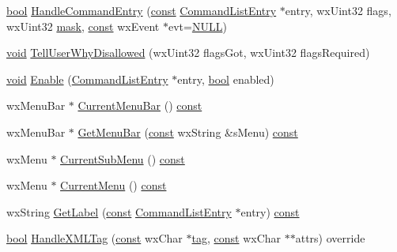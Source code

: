 \begin{DoxyCompactItemize}
\hyperlink{mac_2config_2i386_2lib-src_2libsoxr_2soxr-config_8h_abb452686968e48b67397da5f97445f5b}{bool} \hyperlink{class_command_manager_a2047a83e3554cd09743643968736d1a9}{Handle\+Command\+Entry} (\hyperlink{getopt1_8c_a2c212835823e3c54a8ab6d95c652660e}{const} \hyperlink{struct_command_list_entry}{Command\+List\+Entry} $\ast$entry, wx\+Uint32 flags, wx\+Uint32 \hyperlink{structmask}{mask}, \hyperlink{getopt1_8c_a2c212835823e3c54a8ab6d95c652660e}{const} wx\+Event $\ast$evt=\hyperlink{px__mixer_8h_a070d2ce7b6bb7e5c05602aa8c308d0c4}{N\+U\+LL})
\item 
\hyperlink{sound_8c_ae35f5844602719cf66324f4de2a658b3}{void} \hyperlink{class_command_manager_afe3ecb151af1777dbc3e307265c9d8e1}{Tell\+User\+Why\+Disallowed} (wx\+Uint32 flags\+Got, wx\+Uint32 flags\+Required)
\item 
\hyperlink{sound_8c_ae35f5844602719cf66324f4de2a658b3}{void} \hyperlink{class_command_manager_a86d9c8b5613a5da4c6967d03e3a1bfaa}{Enable} (\hyperlink{struct_command_list_entry}{Command\+List\+Entry} $\ast$entry, \hyperlink{mac_2config_2i386_2lib-src_2libsoxr_2soxr-config_8h_abb452686968e48b67397da5f97445f5b}{bool} enabled)
\item 
wx\+Menu\+Bar $\ast$ \hyperlink{class_command_manager_a9211babaf4c88541a0a4d57c38724582}{Current\+Menu\+Bar} () \hyperlink{getopt1_8c_a2c212835823e3c54a8ab6d95c652660e}{const} 
\item 
wx\+Menu\+Bar $\ast$ \hyperlink{class_command_manager_a4461bc53140bf9640a07ad748474bf19}{Get\+Menu\+Bar} (\hyperlink{getopt1_8c_a2c212835823e3c54a8ab6d95c652660e}{const} wx\+String \&s\+Menu) \hyperlink{getopt1_8c_a2c212835823e3c54a8ab6d95c652660e}{const} 
\item 
wx\+Menu $\ast$ \hyperlink{class_command_manager_aee258f130ed87516ffb340da425f0d16}{Current\+Sub\+Menu} () \hyperlink{getopt1_8c_a2c212835823e3c54a8ab6d95c652660e}{const} 
\item 
wx\+Menu $\ast$ \hyperlink{class_command_manager_a15d5b893166eb25cbe573c7a7edce62e}{Current\+Menu} () \hyperlink{getopt1_8c_a2c212835823e3c54a8ab6d95c652660e}{const} 
\item 
wx\+String \hyperlink{class_command_manager_a878e79d0e1748f855a3bffdaa67cbe76}{Get\+Label} (\hyperlink{getopt1_8c_a2c212835823e3c54a8ab6d95c652660e}{const} \hyperlink{struct_command_list_entry}{Command\+List\+Entry} $\ast$entry) \hyperlink{getopt1_8c_a2c212835823e3c54a8ab6d95c652660e}{const} 
\item 
\hyperlink{mac_2config_2i386_2lib-src_2libsoxr_2soxr-config_8h_abb452686968e48b67397da5f97445f5b}{bool} \hyperlink{class_command_manager_ac9423729c1eedcefdc2c5088485c2441}{Handle\+X\+M\+L\+Tag} (\hyperlink{getopt1_8c_a2c212835823e3c54a8ab6d95c652660e}{const} wx\+Char $\ast$\hyperlink{structtag}{tag}, \hyperlink{getopt1_8c_a2c212835823e3c54a8ab6d95c652660e}{const} wx\+Char $\ast$$\ast$attrs) override
$$
\end{DoxyCompactItemize}
